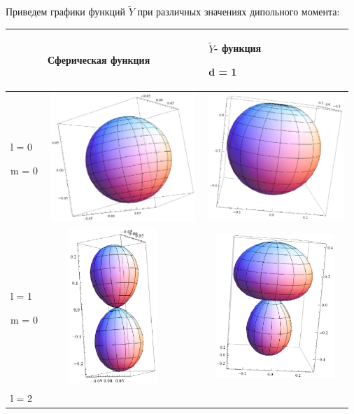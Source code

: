 Приведем графики
функций  $\widetilde Y$ при
различных значениях дипольного момента:


\begin{tabular}{|m{1.472cm}|m{7.8010006cm}|m{7.0090003cm}|}
\hline
~
 &
Сферическая
функция &
 $\widetilde Y${}- функция

d = 1\\\hline
l = 0

m = 0 &
\includegraphics[width=5.722cm,height=4.842cm]{chervinskaya-1.eps}
  &
\includegraphics[width=5.106cm,height=4.748cm]{chervinskaya-2.eps}
 \\\hline
l = 1

m = 0 &
\includegraphics[width=4.948cm,height=5.9cm]{chervinskaya-3.eps}
  &
\includegraphics[width=5.027cm,height=5.457cm]{chervinskaya-4.eps}
 \\\hline
l = 2


\end{tabular}
